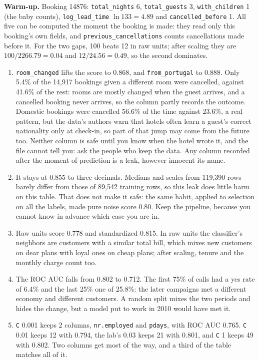 \begin{expectedfindings}
\textbf{Warm-up.} Booking 14876: \texttt{total\_nights} 6, \texttt{total\_guests} 3, \texttt{with\_children} 1 (the baby counts), \texttt{log\_lead\_time} $\ln 133 = 4.89$ and \texttt{cancelled\_before} 1. All five can be computed the moment the booking is made: they read only this booking's own fields, and \texttt{previous\_cancellations} counts cancellations made before it. For the two gaps, 100 beats 12 in raw units; after scaling they are $100/2266.79=0.04$ and $12/24.56=0.49$, so the second dominates.
\begin{enumerate}
  \item \texttt{room\_changed} lifts the score to 0.868, and \texttt{from\_portugal} to 0.888. Only 5.4\% of the 14,917 bookings given a different room were cancelled, against 41.6\% of the rest: rooms are mostly changed when the guest arrives, and a cancelled booking never arrives, so the column partly records the outcome. Domestic bookings were cancelled 56.6\% of the time against 23.6\%, a real pattern, but the data's authors warn that hotels often learn a guest's correct nationality only at check-in, so part of that jump may come from the future too. Neither column is safe until you know when the hotel wrote it, and the file cannot tell you: ask the people who keep the data. Any column recorded after the moment of prediction is a leak, however innocent its name.
  \item It stays at 0.855 to three decimals. Medians and scales from 119,390 rows barely differ from those of 89,542 training rows, so this leak does little harm on this table. That does not make it safe: the same habit, applied to selection on all the labels, made pure noise score 0.80. Keep the pipeline, because you cannot know in advance which case you are in.
  \item Raw units score 0.778 and standardized 0.815. In raw units the classifier's neighbors are customers with a similar total bill, which mixes new customers on dear plans with loyal ones on cheap plans; after scaling, tenure and the monthly charge count too.
  \item The ROC AUC falls from 0.802 to 0.712. The first 75\% of calls had a yes rate of 6.4\% and the last 25\% one of 25.8\%: the later campaigns met a different economy and different customers. A random split mixes the two periods and hides the change, but a model put to work in 2010 would have met it.
  \item \texttt{C} 0.001 keeps 2 columns, \texttt{nr.employed} and \texttt{pdays}, with ROC AUC 0.765. \texttt{C} 0.01 keeps 12 with 0.794, the lab's 0.03 keeps 21 with 0.801, and \texttt{C} 1 keeps 49 with 0.802. Two columns get most of the way, and a third of the table matches all of it.
\end{enumerate}
\end{expectedfindings}

